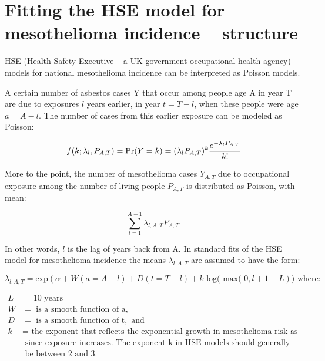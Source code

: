 \documentclass[paper=letter,listof=leveldown,appendixprefix=true]{scrreprt}\usepackage{graphicx, color}
\begin{document}
\chapter{Fitting the HSE model for mesothelioma incidence -- structure}

HSE (Health Safety Executive -- a UK government occupational health agency) models for national mesothelioma incidence can be interpreted as Poisson models.

A certain number of asbestos cases Y that occur among people age A in year T are due to exposures $l$ years earlier, in year $t = T-l$, when these people were age $a = A - l$.  The number of cases from this earlier exposure can be modeled as Poisson:

\begin{equation*}
\ f(k;\lambda_{l},P_{A,T}) = \text{Pr}(Y=k) = (\lambda_{l} P_{A,T})^k  {e^{-\lambda_{l} P_{A,T}} \over k!}
\end{equation*}



More to the point, the number of mesothelioma cases $Y_{A,T}$ due to occupational exposure among the number of living people $P_{A,T}$ is distributed as Poisson, with mean:

\begin{equation*}
\sum\limits_{l=1}^{A-1} \lambda_{l,A,T} P_{A,T}
\end{equation*}

In other words, $l$ is the lag of years back from A. In standard fits of the HSE model for mesothelioma incidence the means $\lambda_{l,A,T}$ are assumed to have the form:


\begin{equation*}
\lambda_{l,A,T} = \text{exp}( \alpha + W(a=A-l) + D(t=T-l) + k\text{ log( max( } 0, l + 1 - L)) \text{ where:}
\end{equation*}

\begin{align*}
L & = 10 \text{ years}\\
W & = \text{ is a smooth function of a}, \\
D & = \text{ is a smooth function of t}, \text{ and} \\
k & = \text{ the exponent that reflects the exponential growth in mesothelioma risk as time} \\ 
  & \text{      since exposure increases.  The exponent k in HSE models should generally} \\
  & \text{      be between 2 and 3.} 
\end{align*}
\end{document}
